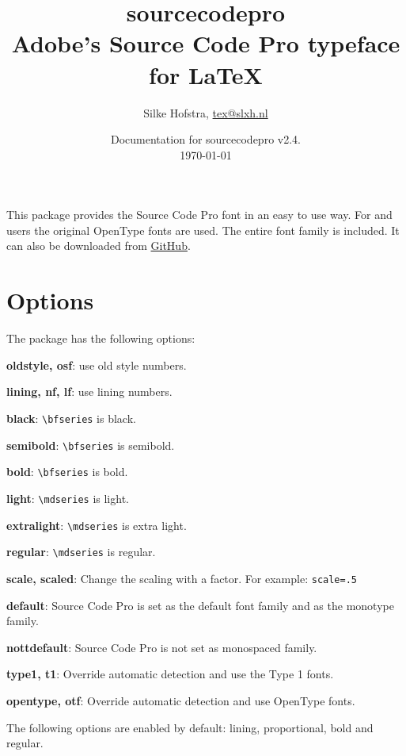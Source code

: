 \documentclass[10pt,a4paper,english]{article}
\title{\bfseries
	\Huge sourcecodepro\\
	\Large Adobe's Source Code Pro typeface for \LaTeX
}
\author{Silke Hofstra, \href{mailto:tex@slxh.nl}{tex@slxh.nl}}
\date{Documentation for sourcecodepro v2.4.\\ \today}
\begin{document}
\maketitle
\begin{multicols}{2}
This package provides the Source Code Pro font in an easy to use way. For  and  users the original OpenType fonts are used. The entire font family is included. It can also be downloaded from \href{https://github.com/adobe-fonts/source-code-pro}{GitHub}.

\section{Options}
The package has the following options:
\begin{itemize*}
	\item \textbf{oldstyle, osf}:  use old style numbers.
	\item \textbf{lining, nf, lf}: use lining numbers.
	\item \textbf{black}:          \texttt{\textbackslash bfseries} is black.
	\item \textbf{semibold}:       \texttt{\textbackslash bfseries} is semibold.
	\item \textbf{bold}:           \texttt{\textbackslash bfseries} is bold.
	\item \textbf{light}:          \texttt{\textbackslash mdseries} is light.
	\item \textbf{extralight}:     \texttt{\textbackslash mdseries} is extra light.
	\item \textbf{regular}:        \texttt{\textbackslash mdseries} is regular.
	\item \textbf{scale, scaled}:  Change the scaling with a factor. For example:  \texttt{scale=.5}
	\item \textbf{default}:        Source Code Pro is set as the default font family and as the monotype family.
	\item \textbf{nottdefault}:    Source Code Pro is not set as monospaced family.
	\item \textbf{type1, t1}:      Override automatic detection and use the Type 1 fonts.
	\item \textbf{opentype, otf}:  Override automatic detection and use OpenType fonts.
\end{itemize*}
The following options are enabled by default: lining, proportional, bold and regular.


\end{multicols}
\end{document}
